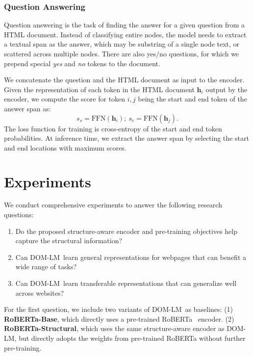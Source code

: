 \documentclass[sigconf, nonacm]{acmart}
\newcommand{\ours}[0]{DOM-LM}
\newcommand{\nop}[1]{}
\begin{document}
\subsubsection{Question Answering}
Question answering is the task of finding the answer for a given question from a HTML document. Instead of classifying entire nodes, the model needs to extract a textual span as the answer, which may be substring of a single node text, or scattered across multiple nodes. There are also yes/no questions, for which we prepend special \textit{yes} and \textit{no} tokens to the document. 

We concatenate the question and the HTML document as input to the encoder. Given the representation of each token in the HTML document $\mathbf{h}_i$ output by the encoder, we compute the score for token $i, j$ being the start and end token of the answer span as:
\begin{equation}
    s_s = \text{FFN}(\mathbf{h}_i);\ s_e = \text{FFN}(\mathbf{h}_j).
\end{equation}
The loss function for training is cross-entropy of the start and end token probabilities. At inference time, we extract the answer span by selecting the start and end locations with maximum scores. \section{Experiments}
We conduct comprehensive experiments to answer the following research questions:

\begin{enumerate}
	\item Do the proposed structure-aware encoder and pre-training objectives help capture the structural information?
	\item Can \ours\ learn general representations for webpages that can benefit a wide range of tasks?
	\item Can \ours\ learn transferable representations that can generalize well across websites? \nop{For RQ3, it seems hard to link the claim of handling noisy real-world data to the experiment. Readers may not be aware that Demeter data is noisy and there is no experiments artificially add noise into the data.}
\end{enumerate}\nop{Briefly say how you plan to answer these RQs in the coming subsections.}
For the first question, we include two variants of \ours\ as baselines:\nop{should we briefly say why they make good baselines?} (1) \textbf{RoBERTa-Base}, which directly uses a pre-trained RoBERTa~\cite{liu2019roberta} encoder. (2) \textbf{RoBERTa-Structural}, which uses the same structure-aware encoder as \ours, but directly adopts the weights from pre-trained RoBERTa without further pre-training. 
\end{document}
